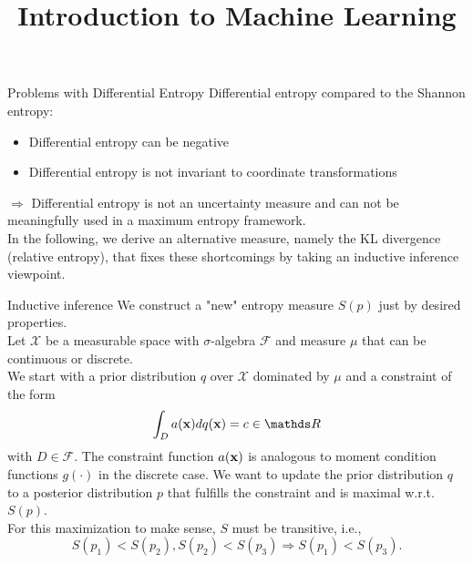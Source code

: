 \documentclass[11pt,compress,t,notes=noshow, xcolor=table]{beamer}
\title{Introduction to Machine Learning}
\date{}
\begin{document}

\begin{vbframe} {Problems with Differential Entropy}
Differential entropy compared to the Shannon entropy:
\begin{itemize}
    \item Differential entropy can be negative
    \item Differential entropy is not invariant to coordinate transformations
\end{itemize}
$\Rightarrow$ Differential entropy is not an uncertainty measure and can not be meaningfully used in a maximum entropy framework. \\
\lz 
In the following, we derive an alternative measure, namely the KL divergence (relative entropy), that fixes these shortcomings by taking an inductive inference viewpoint.  
\end{vbframe}
\begin{vbframe}{Inductive inference}
    We construct a "new" entropy measure $S(p)$ just by desired properties.\\
    \lz
    Let $\mathcal{X}$ be a measurable space with $\sigma$-algebra $\mathcal{F}$ and measure $\mu$ that can be continuous or discrete. \\
    We start with a prior distribution $q$ over $\mathcal{X}$ dominated by $\mu$ and a constraint of the form $$\int_D a(\xv) dq(\xv) = c \in \R$$
    with $D \in \mathcal{F}.$ The constraint function $a(\mathbf{x})$ is analogous to moment condition functions $g(\cdot)$ in the discrete case.
    We want to update the prior distribution $q$ to a posterior distribution $p$ that fulfills the constraint and is maximal w.r.t. $S(p).$  \\
    For this maximization to make sense, $S$ must be transitive, i.e., 
    $$S(p_1) < S(p_2), S(p_2) < S(p_3) \Rightarrow S(p_1) < S(p_3).$$
\end{vbframe}
\end{document}
